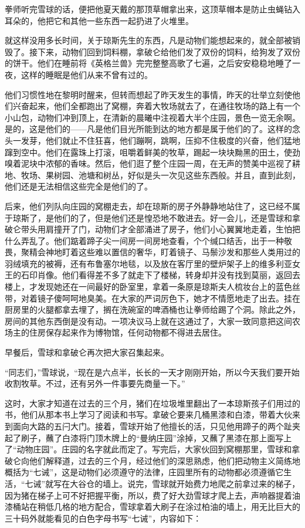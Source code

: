 拳师听完雪球的话，便把他夏天戴的那顶草帽拿出来，这顶草帽本是防止虫蝇钻入耳朵的，他把它和其他一些东西一起扔进了火堆里。

就这样没用多长时间，关于琼斯先生的东西，凡是动物们能想起来的，就全部被销毁了。接下来，动物们回到饲料棚，拿破仑给他们发了双份的饲料，给狗发了双份的饼干。他们在睡前将《英格兰兽》完完整整高歌了七遍，之后安安稳稳地睡了一夜，这样的睡眠是他们从来不曾有过的。

他们习惯性地在黎明时醒来，但转而想起了昨天发生的事情，昨天的壮举立刻使他们兴奋起来，他们全都跑出了窝棚，奔着大牧场就去了，在通往牧场的路上有一个小山包，动物们冲到顶上，在清新的晨曦中注视着大半个庄园，景色一览无余啊。是的，这是他们的——凡是他们目光所能到达的地方都是属于他们的了。这样的念头一发芽，他们就止不住狂喜，他们蹦啊，跳啊，压抑不住极度的兴奋，他们猛地蹿到空中。他们在露珠上打滚，咀嚼着鲜美的牧草，踢起一块块黝黑的田土，使劲嗅着泥块中浓郁的香味。然后，他们逛了整个庄园一周，在无声的赞美中巡视了耕地、牧场、果树园、池塘和树丛，好似是头一次见这些东西般。并且，直到此刻，他们还是无法相信这些完全是他们的了。

后来，他们列队向庄园的窝棚走去，却在琼斯的房子外静静地站住了，这已经不属于琼斯了，是他们的了，但是他们还是惶恐地不敢进去。好一会儿，还是雪球和拿破仑带头用肩撞开了门，动物们才全部涌进了房子，他们小心翼翼地走着，生怕把什么弄乱了。他们踮着蹄子尖一间房一间房地查看，个个缄口结舌，出于一种敬畏，聚精会神地盯着这些难以置信的奢华，盯着镜子、马鬃沙发和那些人类用过的羽绒填充的被褥，还有布鲁塞尔地毯，以及放在客厅里的壁炉架子上的维多利亚女王的石印肖像。他们看得差不多了就走下了楼梯，转身却并没有找到莫丽，返回去楼上，才发现她还在一间最好的卧室里，拿着一条原是琼斯夫人梳妆台上的蓝色丝带，对着镜子傻呵呵地臭美。在大家的严词厉色下，她才不情愿地走了出去。挂在厨房里的火腿都拿去埋了，搁在洗碗室的啤酒桶也让拳师给踢了个洞。除此之外，房间的其他东西倒是没有动。一项决议马上就在这通过了，大家一致同意把这间农场主的住房保存起来作为博物馆，任何动物都不得进去居住。

早餐后，雪球和拿破仑再次把大家召集起来。

“同志们，”雪球说，“现在是六点半，长长的一天才刚刚开始，所以今天我们要开始收割牧草。不过，还有另外一件事要先商量一下。”

这时，大家才知道在过去的三个月，猪们在垃圾堆里翻出了一本琼斯孩子们用过的书，他们从那本书上学习了阅读和书写。拿破仑要来几桶黑漆和白漆，带着大伙来到面向大路的五闩大门。接着，雪球开始了他擅长的活，只见他用蹄子的两个趾夹起了刷子，蘸了白漆将门顶木牌上的“曼纳庄园”涂掉，又蘸了黑漆在那上面写上了“动物庄园”。庄园的名字就此而定了。写完后，大家伙回到窝棚那里，雪球和拿破仑向他们解释道，过去的三个月，经过他们的深思熟虑，他们把动物主义简练地概括为“七诫”，这是动物们必须遵守的法律，庄园里所有的动物都必须遵循它生活，“七诫”就写在大谷仓的墙上。说完，雪球就开始费力地爬之前拿过来的梯子，因为猪在梯子上可不好把握平衡，所以，费了好大劲雪球才爬上去，声响器提着油漆桶站在稍低几格的地方配合，雪球拿着大刷子在涂过柏油的墙上，用无比巨大的三十码外就能看见的白色字母书写“七诫”，内容如下：

